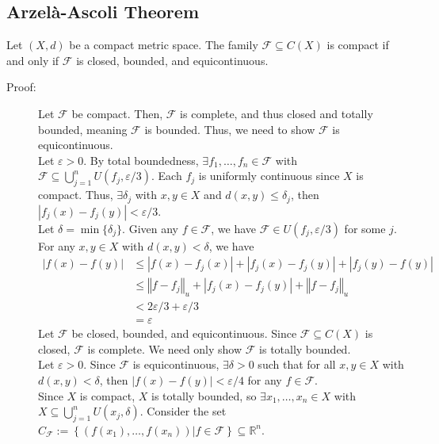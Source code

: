 \documentclass[10pt]{extarticle}
\newcommand{\R}{\mathbb{R}}
\newcommand{\norm}[1]{\left\Vert #1 \right\Vert}
\begin{document}
  \subsection{Arzelà-Ascoli Theorem}%
  Let $(X,d)$ be a compact metric space. The family $\mathcal{F}\subseteq C(X)$ is compact if and only if $\mathcal{F}$ is closed, bounded, and equicontinuous.
  \begin{description}
    \item[Proof:] Let $\mathcal{F}$ be compact. Then, $\mathcal{F}$ is complete, and thus closed and totally bounded, meaning $\mathcal{F}$ is bounded. Thus, we need to show $\mathcal{F}$ is equicontinuous.\\

      Let $\varepsilon > 0$. By total boundedness, $\exists f_1,\dots,f_n\in \mathcal{F}$ with $\mathcal{F}\subseteq \bigcup_{j=1}^{n} U(f_j,\varepsilon/3)$. Each $f_j$ is uniformly continuous since $X$ is compact. Thus, $\exists \delta_j$ with $x,y\in X$ and $d(x,y)\leq \delta_j$, then $|f_j(x)-f_j(y)| < \varepsilon/3$.\\

      Let $\delta = \min\{\delta_j\}$. Given any $f\in \mathcal{F}$, we have $\mathcal{F}\in U(f_j,\varepsilon/3)$ for some $j$. For any $x,y\in X$ with $d(x,y) < \delta$, we have
      \begin{align*}
        |f(x)-f(y)| &\leq |f(x)-f_j(x)| + |f_j(x)-f_j(y)| + |f_j(y)-f(y)|\\
                    &\leq \norm{f-f_j}_u + |f_j(x)-f_j(y)| + \norm{f-f_j}_u\\
                    &< 2\varepsilon/3 + \varepsilon/3\\
                    &= \varepsilon
      \end{align*}
      Let $\mathcal{F}$ be closed, bounded, and equicontinuous. Since $\mathcal{F} \subseteq C(X)$ is closed, $\mathcal{F}$ is complete. We need only show $\mathcal{F}$ is totally bounded.\\

      Let $\varepsilon > 0$. Since $\mathcal{F}$ is equicontinuous, $\exists \delta > 0$ such that for all $x,y\in X$ with $d(x,y) < \delta$, then $|f(x)-f(y)| < \varepsilon/4$ for any $f\in \mathcal{F}$.\\

      Since $X$ is compact, $X$ is totally bounded, so $\exists x_1,\dots,x_n\in X$ with $X\subseteq \bigcup_{j=1}^{n}U(x_j,\delta)$. Consider the set $C_{\mathcal{F}} := \left\{\left(f(x_1),\dots,f(x_n)\right)|f\in\mathcal{F}\right\}\subseteq \R^n$.\\


\end{description}
\end{document}
